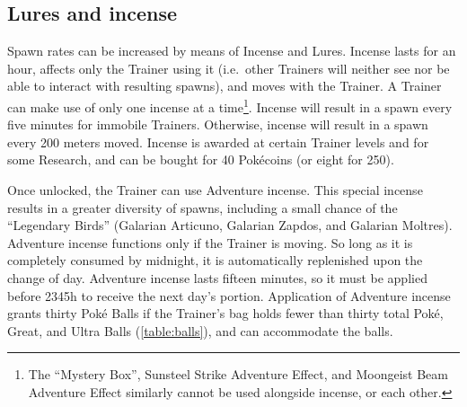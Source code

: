 \subsection{Lures and incense}
Spawn rates can be increased by means of Incense and Lures.
Incense lasts for an hour, affects only the Trainer using it (i.e.\ other Trainers
  will neither see nor be able to interact with resulting spawns),
  and moves with the Trainer.
A Trainer can make use of only one incense at a time\footnote{The
  ``Mystery Box'', Sunsteel Strike Adventure Effect, and
  Moongeist Beam Adventure Effect similarly cannot be used
  alongside incense, or each other.}.
Incense will result in a spawn every five minutes for immobile Trainers.
Otherwise, incense will result in a spawn every 200 meters moved.
Incense is awarded at certain Trainer levels and for some Research,
  and can be bought for 40 Pokécoins (or eight for 250).

Once unlocked, the Trainer can use Adventure incense.
This special incense results in a greater diversity of spawns, including
  a small chance of the ``Legendary Birds''
  (Galarian Articuno, Galarian Zapdos, and Galarian Moltres).
Adventure incense functions only if the Trainer is moving.
So long as it is completely consumed by midnight, it is automatically replenished
  upon the change of day.
Adventure incense lasts fifteen minutes, so it must be applied before 2345h
  to receive the next day's portion.
Application of Adventure incense grants thirty Poké Balls if the Trainer's
  bag holds fewer than thirty total Poké, Great, and Ultra Balls (\autoref{table:balls}),
  and can accommodate the balls.

